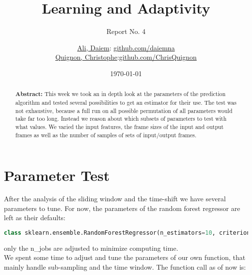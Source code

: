 \documentclass{scrartcl}
\begin{document}
\title{Learning and Adaptivity}
\subtitle{Report No. 4}
\author{
  \href{daiem.ali@smail.inf.h-brs.de}{Ali, Daiem}: \href{https://github.com/daiemna}{github.com/daiemna}\\
  \href{christophe.quignon@smail.inf.h-brs.de}{Quignon, Christophe}:\href{https://github.com/ChrisQuignon}{github.com/ChrisQuignon}
}
\date{\today}


\maketitle



\begin{abstract}
\textbf{Abstract:}
This week we took an in depth look at the parameters of the prediction algorithm and tested several possibilities to get an estimator for their use. The test was not exhaustive, because a full run on all possible permutation of all parameters would take far too long. Instead we reason about which subsets of parameters to test with what values. We varied the input features, the frame sizes of the input and output frames as well as the number of samples of sets of input/output frames. 
\end{abstract}

\section{Parameter Test}
\label{sec:parameter}
After the analysis of the sliding window and the time-shift we have several parameters to tune. For now, the parameters of the random forest regressor are left as their defaults:
\begin{lstlisting}[language=Python]
class sklearn.ensemble.RandomForestRegressor(n_estimators=10, criterion='mse', max_depth=None, min_samples_split=2, min_samples_leaf=1, min_weight_fraction_leaf=0.0, max_features='auto', max_leaf_nodes=None, bootstrap=True, oob_score=False, n_jobs=1, random_state=None, verbose=0, warm_start=False)
\end{lstlisting}

only  the n\_jobs are adjusted to minimize computing time.\\
We spent some time to adjust and tune the parameters of our own function, that mainly handle sub-sampling and the time window. The function call as of now is:
\end{document}
